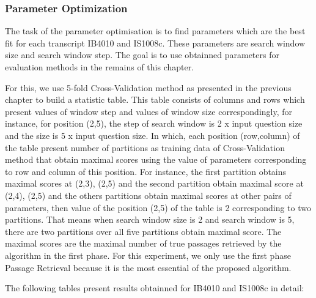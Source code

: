 \documentclass[10pt,a4paper]{article}
\numberwithin{algorithm}{section}  %
\begin{document}
\normalsize

\pagebreak
\subsubsection*{Parameter Optimization}
The task of the parameter optimisation is to find parameters which are the best fit for each transcript IB4010 and IS1008c. These parameters are search window size and search window step. The goal is to use obtainned parameters for evaluation methods in the remains of this chapter.

For this, we use 5-fold Cross-Validation method as presented in the previous chapter to build a statistic table. This table consists of columns and rows which present values of window step and values of window size correspondingly, for instance, for position (2,5), the step of search window is 2 x input question size and the size is 5 x input question size. In which, each position (row,column) of the table present number of partitions as training data of Cross-Validation method that obtain maximal scores using the value of parameters corresponding to row and column of this position. For instance, the first partition obtains maximal scores at (2,3), (2,5) and the second partition obtain maximal score at (2,4), (2,5) and the others partitions obtain maximal scores at other pairs of parameters, then value of the position (2,5) of the table is 2 corresponding to two partitions. That means when search window size is 2 and search window is 5, there are two partitions over all five partitions obtain maximal score. The maximal scores are the maximal number of true passages retrieved by the algorithm in the first phase. For this experiment, we only use the first phase Passage Retrieval because it is the most essential of the proposed algorithm.

The following tables present results obtainned for IB4010 and IS1008c in detail:
\end{document}
